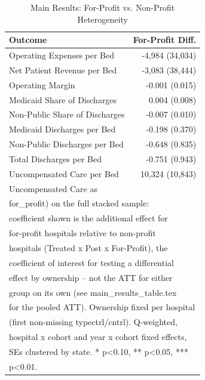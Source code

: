 \begin{table}[!h]
\centering
\caption{Main Results: For-Profit vs. Non-Profit Heterogeneity}
\centering
\begin{tabular}[t]{lr}
\toprule
Outcome & For-Profit Diff.\\
\midrule
Operating Expenses per Bed & -4,984 (34,034)\\
Net Patient Revenue per Bed & -3,083 (38,444)\\
Operating Margin & -0.001 (0.015)\\
Medicaid Share of Discharges & 0.004 (0.008)\\
Non-Public Share of Discharges & -0.007 (0.010)\\
\addlinespace
Medicaid Discharges per Bed & -0.198 (0.370)\\
Non-Public Discharges per Bed & -0.648 (0.835)\\
Total Discharges per Bed & -0.751 (0.943)\\
Uncompensated Care per Bed & 10,324 (10,843)\\
Uncompensated Care as %
\bottomrule
\multicolumn{2}{l}{\textsuperscript{} Triple-interaction model (treated x post x}\\
\multicolumn{2}{l}{for\_profit) on the full stacked sample:}\\
\multicolumn{2}{l}{coefficient shown is the additional effect for}\\
\multicolumn{2}{l}{for-profit hospitals relative to non-profit}\\
\multicolumn{2}{l}{hospitals (Treated x Post x For-Profit), the}\\
\multicolumn{2}{l}{coefficient of interest for testing a differential}\\
\multicolumn{2}{l}{effect by ownership -- not the ATT for either}\\
\multicolumn{2}{l}{group on its own (see main\_results\_table.tex}\\
\multicolumn{2}{l}{for the pooled ATT). Ownership fixed per hospital}\\
\multicolumn{2}{l}{(first non-missing typectrl/cntrl). Q-weighted,}\\
\multicolumn{2}{l}{hospital x cohort and year x cohort fixed effects,}\\
\multicolumn{2}{l}{SEs clustered by state. * p<0.10, ** p<0.05, ***}\\
\multicolumn{2}{l}{p<0.01.}\\
\end{tabular}
\end{table}

